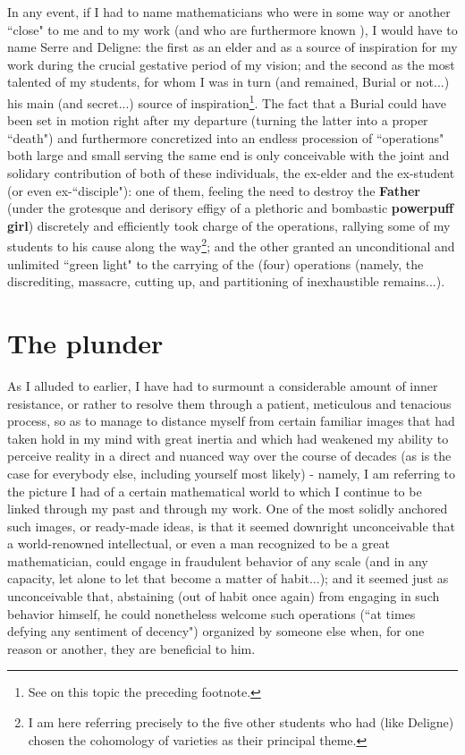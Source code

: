 In any event, if I had to name mathematicians who were in some way or another ``close" to me and to my work (and who are furthermore known ), I would have to name Serre and Deligne: the first as an elder and as a source of inspiration for my work during the crucial gestative period of my vision; and the second as the most talented of my students, for whom I was in turn (and remained, Burial or not...) his main (and secret...) source of inspiration\footnote{See on this topic the preceding footnote.}. The fact that a Burial could have been set in motion right after my departure (turning the latter into a proper ``death") and furthermore concretized into an endless procession of ``operations" both large and small serving the same end is only conceivable with the joint and solidary contribution of both of these individuals, the ex-elder and the ex-student (or even ex-``disciple"): one of them, feeling the need to destroy the \textbf{Father} (under the grotesque and derisory effigy of a plethoric and bombastic \textbf{powerpuff girl}) discretely and efficiently took charge of the operations, rallying some of my students to his cause along the way\footnote{I am here referring precisely to the five other students who had (like Deligne) chosen the cohomology of varieties as their principal theme.}; and the other granted an unconditional and unlimited ``green light" to the carrying of the (four) operations (namely, the discrediting, massacre, cutting up, and partitioning of inexhaustible remains...).

\section{The plunder}

As I alluded to earlier, I have had to surmount a considerable amount of inner resistance, or rather to resolve them through a patient, meticulous and tenacious process, so as to manage to distance myself from certain familiar images that had taken hold in my mind with great inertia and which had weakened my ability to perceive reality in a direct and nuanced way over the course of decades (as is the case for everybody else, including yourself most likely) - namely, I am referring to the picture I had of a certain mathematical world to which I continue to be linked through my past and through my work. One of the most solidly anchored such images, or ready-made ideas, is that it seemed downright unconceivable that a world-renowned intellectual, or even a man recognized to be a great mathematician, could engage in fraudulent behavior of any scale (and in any capacity, let alone to let that become a matter of habit...); and it seemed just as unconceivable that, abstaining (out of habit once again) from engaging in such behavior himself, he could nonetheless welcome such operations (``at times defying any sentiment of decency") organized by someone else when, for one reason or another, they are beneficial to him.

